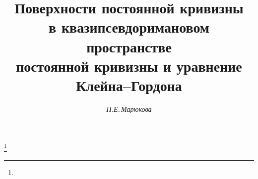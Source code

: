 




%


\newcommand{\const}{\operatorname{const}}


\newcommand{\tts}[1]{} 







\setcounter{page}{36}















\author{\it Н.Е.\,Марюкова}




\title{Поверхности постоянной кривизны\\


в квазипсевдоримановом пространстве\\


постоянной кривизны и уравнение Клейна--Гордона}


\thanks{}





\date{}




\pagestyle{plain} %







\maketitle


